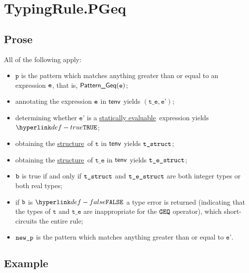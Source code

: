 \documentclass{book}
\newcommand\ProseOrTypeError[0]{\ProseTerminateAs{\TypeErrorConfig}}
\newcommand\structure[0]{\hyperlink{def-structure}{structure}}
\newcommand\staticallyevaluable[0]{\hyperlink{def-staticallyevaluable}{statically evaluable}}
\newcommand\vp[0]{\texttt{p}}
\newcommand\vt[0]{\texttt{t}}
\newcommand\vte[0]{\texttt{t\_e}}
\newcommand\vep[0]{\texttt{e'}}
\begin{document}

\section{TypingRule.PGeq \label{sec:TypingRule.PGeq}}

\subsection{Prose}
All of the following apply:
\begin{itemize}
\item $\vp$ is the pattern which matches anything greater than or equal to an expression $\texttt{e}$,
that is, $\textsf{Pattern\_Geq}(\texttt{e})$;
\item annotating the expression $\texttt{e}$ in $\textsf{tenv}$ yields $(\vte, \vep)$\ProseOrTypeError;
\item determining whether $\vep$ is a \staticallyevaluable\ expression yields $\True$\ProseOrTypeError;
\item obtaining the \structure\ of $\vt$ in $\textsf{tenv}$ yields $\texttt{t\_struct}$\ProseOrTypeError;
\item obtaining the \structure\ of $\vte$ in $\textsf{tenv}$ yields $\texttt{t\_e\_struct}$\ProseOrTypeError;
\item $\texttt{b}$ is true if and only if $\texttt{t\_struct}$ and $\texttt{t\_e\_struct}$ are both integer types or both real types;
\item if $\texttt{b}$ is $\False$ a type error is returned (indicating that the types of $\vt$ and $\vte$
      are inappropriate for the $\texttt{GEQ}$ operator),
which short-circuits the entire rule;
\item $\texttt{new\_p}$ is the pattern which matches anything greater than or equal to $\vep$.
\end{itemize}

\subsection{Example}

\end{document}
